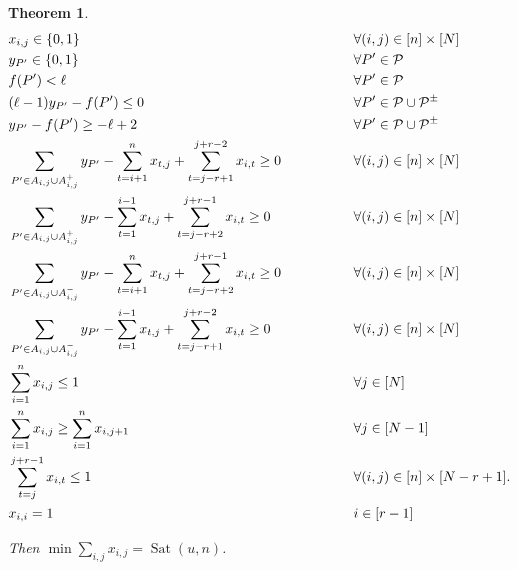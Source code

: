 \documentclass[12pt]{amsart}
\DeclareMathOperator{\Sat}{Sat}
\newtheorem{thm}{Theorem}
\theoremstyle{definition}
\numberwithin{equation}{section}
\numberwithin{table}{thm}
\begin{document}
\begin{thm}
    \begin{alignat}{2}
        & x_{i,j}\in\{0,1\} &\hspace{1.5cm}& \forall(i,j)\in[n]\times[N] \\
        & y_{P'}\in\{0,1\}  &&       \forall P'\in\mathcal P \\
        & f(P')<\ell  &&       \forall P'\in\mathcal P \label{eqn:not_contain}\\
        & (\ell-1)y_{P'}-f(P') \le0 &&  \forall P'\in\mathcal P\cup \mathcal P^{\pm}  \label{eqn:yp'_cond_1}\\
        & y_{P'}-f(P')\ge-\ell+2 &&  \forall P'\in\mathcal P\cup \mathcal P^{\pm}  \label{eqn:yp'_cond_2}\\
        & \sum_{P'\in A_{i,j}\cup A_{i,j}^+}y_{P'} - \sum_{t=i+1}^{n} x_{t,j}+\sum_{t=j-r+1}^{j+r-2}x_{i,t}\ge 0 &&  \forall(i,j)\in[n]\times[N]  \label{eqn:changeone+above}\\
        & \sum_{P'\in A_{i,j}\cup A_{i,j}^+}y_{P'} - \sum_{t=1}^{i-1} x_{t,j}+ \sum_{t=j-r+2}^{j+r-1}x_{i,t}\ge 0 &&  \forall(i,j)\in[n]\times[N]  \label{eqn:changeone+under} \\
        & \sum_{P'\in A_{i,j}\cup A_{i,j}^-}y_{P'} - \sum_{t=i+1}^{n} x_{t,j}+\sum_{t=j-r+2}^{j+r-1}x_{i,t}\ge 0 &&  \forall(i,j)\in[n]\times[N]  \label{eqn:changeone-above} \\
        & \sum_{P'\in A_{i,j}\cup A_{i,j}^-}y_{P'} - \sum_{t=1}^{i-1} x_{t,j}+ \sum_{t=j-r+1}^{j+r-2}x_{i,t}\ge 0 && \forall(i,j)\in[n]\times[N]   \label{eqn:changeone-under} \\
        & \sum_{i = 1}^n x_{i,j}\le 1 &&  \forall j \in [N]  \label{eqn:onepercol} \\
        & \sum_{i = 1}^n x_{i,j} \ge \sum_{i = 1}^n x_{i,j+1} &&  \forall j \in [N-1]  \label{eqn:leftjustified} \\
        & \sum_{t = j}^{j+r-1} x_{i,t}\le1 && \forall (i,j) \in [n]\times[N-r+1]. \label{eqn:sparsity}\\
        & x_{i,i}=1  && i\in [r-1]\label{eqn: nontrivial}
    \end{alignat}
    
    Then $\displaystyle \min\sum_{i,j}x_{i,j}=\Sat(u, n)$.
\end{thm}
\end{document}
